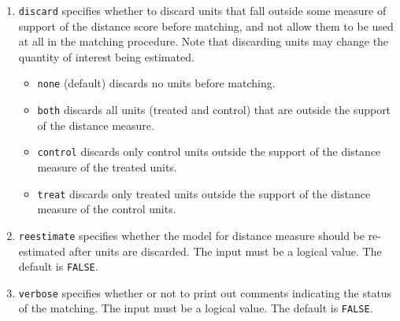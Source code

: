 \documentclass[oneside,letterpaper,titlepage]{article}
\begin{document}
\begin{enumerate}
\item \texttt{discard} specifies whether to discard units that fall
  outside some measure of support of the distance score before matching, and not
  allow them to be used at all in the matching procedure.  Note that discarding
  units may change the quantity of interest being estimated.
  \begin{itemize}
  \item \texttt{none} (default) discards no units before matching. 
  \item \texttt{both} discards all units (treated and control) that are outside the support
    of the distance measure.  
  \item \texttt{control} discards only control units outside the
    support of the distance measure of the treated units.  
  \item \texttt{treat} discards only treated units outside the support
    of the distance measure of the control units.  
  \end{itemize}
  
\item \texttt{reestimate} specifies whether the model for distance
  measure should be re-estimated after units are discarded. The input
  must be a logical value. The default is \texttt{FALSE}.

\item \texttt{verbose} specifies whether or not to print out comments
  indicating the status of the matching. The input must be a logical
  value. The default is \texttt{FALSE}.
\end{enumerate}
\end{document}
